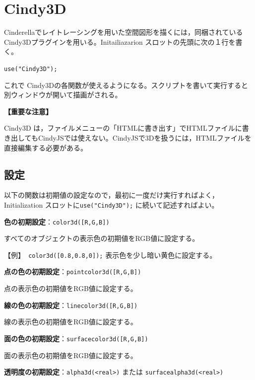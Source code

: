 \documentclass[papersize,a4paper,12pt,uplatex]{jsarticle}
\begin{document}
\section{Cindy3D}

Cinderellaでレイトレーシングを用いた空間図形を描くには，同梱されている Cindy3Dプラグインを用いる。Initailiazarion スロットの先頭に次の１行を書く。

\vspace{\baselineskip}
\verb|use("Cindy3D");|

\vspace{\baselineskip}
これで Cindy3Dの各関数が使えるようになる。スクリプトを書いて実行すると別ウィンドウが開いて描画がされる。

\vspace{\baselineskip}
\noindent
{\bf 【重要な注意】}

Cindy3D は，ファイルメニューの「HTMLに書き出す」でHTMLファイルに書き出してもCindyJSでは使えない。CindyJSで3Dを扱うには，HTMLファイルを直接編集する必要がある。

 \subsection{設定}

以下の関数は初期値の設定なので，最初に一度だけ実行すればよく， Initialization スロットに\verb|use("Cindy3D");| に続いて記述すればよい。
 
\vspace{\baselineskip}
\noindent
{\bf 色の初期設定}：\verb|color3d([R,G,B])|

すべてのオブジェクトの表示色の初期値をRGB値に設定する。

\noindent
【例】\verb| color3d([0.8,0.8,0]);|  表示色を少し暗い黄色に設定する。

\vspace{\baselineskip}
\noindent
{\bf 点の色の初期設定}：\verb|pointcolor3d([R,G,B])|

点の表示色の初期値をRGB値に設定する。

\vspace{\baselineskip}
\noindent
{\bf 線の色の初期設定}：\verb|linecolor3d([R,G,B])|

線の表示色の初期値をRGB値に設定する。

\vspace{\baselineskip}
\noindent
{\bf 面の色の初期設定}：\verb|surfacecolor3d([R,G,B])|

面の表示色の初期値をRGB値に設定する。

\vspace{\baselineskip}
\noindent
{\bf 透明度の初期設定}：\verb|alpha3d(<real>)| または \verb|surfacealpha3d(<real>)|
\end{document}
